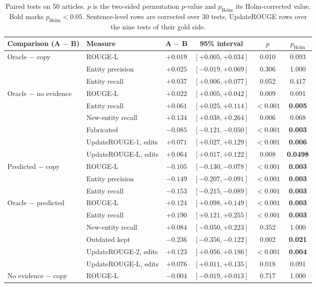 \documentclass[]{paper}
\begin{document}
\begin{table}[t]
\caption{Paired tests on 50 articles. $p$ is the two-sided permutation $p$-value and $p_{\text{Holm}}$ its Holm-corrected value. Bold marks $p_{\text{Holm}} < 0.05$. Sentence-level rows are corrected over 30 tests, UpdateROUGE rows over the nine tests of their gold side.}
\label{tab:tests}
\centering
\footnotesize
\begin{tabular}{llcccc}
\toprule
Comparison (A $-$ B) & Measure & A $-$ B & 95\% interval & $p$ & $p_{\text{Holm}}$ \\
\midrule
Oracle $-$ copy & ROUGE-L & $+0.019$ & $[+0.005, +0.034]$ & 0.010 & 0.093 \\
 & Entity precision & $+0.025$ & $[-0.019, +0.069]$ & 0.306 & 1.000 \\
 & Entity recall & $+0.037$ & $[+0.006, +0.077]$ & 0.052 & 0.417 \\
\midrule
Oracle $-$ no evidence & ROUGE-L & $+0.022$ & $[+0.005, +0.042]$ & 0.009 & 0.091 \\
 & Entity recall & $+0.061$ & $[+0.025, +0.114]$ & $<0.001$ & \textbf{0.005} \\
 & New-entity recall & $+0.134$ & $[+0.038, +0.264]$ & 0.006 & 0.068 \\
 & Fabricated & $-0.085$ & $[-0.121, -0.050]$ & $<0.001$ & \textbf{0.003} \\
 & UpdateROUGE-1, edits & $+0.071$ & $[+0.027, +0.129]$ & $<0.001$ & \textbf{0.006} \\
 & UpdateROUGE-L, edits & $+0.064$ & $[+0.017, +0.122]$ & 0.008 & \textbf{0.0498} \\
\midrule
Predicted $-$ copy & ROUGE-L & $-0.105$ & $[-0.130, -0.078]$ & $<0.001$ & \textbf{0.003} \\
 & Entity precision & $-0.149$ & $[-0.207, -0.091]$ & $<0.001$ & \textbf{0.003} \\
 & Entity recall & $-0.153$ & $[-0.215, -0.089]$ & $<0.001$ & \textbf{0.003} \\
\midrule
Oracle $-$ predicted & ROUGE-L & $+0.124$ & $[+0.098, +0.149]$ & $<0.001$ & \textbf{0.003} \\
 & Entity recall & $+0.190$ & $[+0.121, +0.255]$ & $<0.001$ & \textbf{0.003} \\
 & New-entity recall & $+0.084$ & $[-0.050, +0.223]$ & 0.352 & 1.000 \\
 & Outdated kept & $-0.236$ & $[-0.356, -0.122]$ & 0.002 & \textbf{0.021} \\
 & UpdateROUGE-2, edits & $+0.123$ & $[+0.056, +0.186]$ & $<0.001$ & \textbf{0.004} \\
 & UpdateROUGE-L, edits & $+0.076$ & $[+0.011, +0.135]$ & 0.018 & 0.091 \\
\midrule
No evidence $-$ copy & ROUGE-L & $-0.004$ & $[-0.019, +0.013]$ & 0.717 & 1.000 \\
\bottomrule
\end{tabular}
\end{table}
\end{document}
